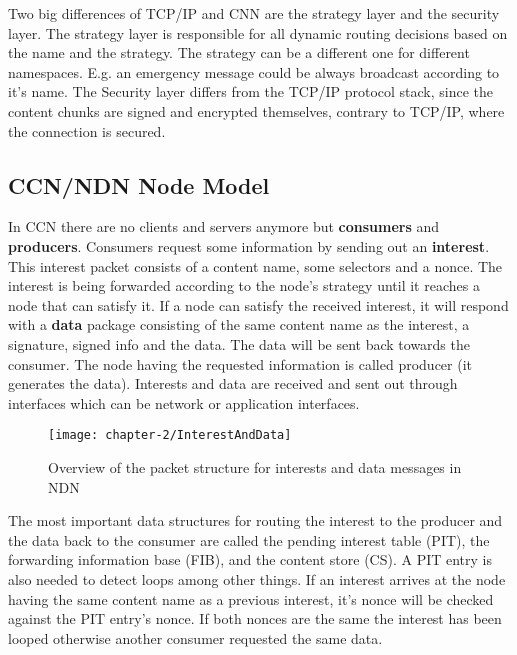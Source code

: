 \vspace{5mm} %

Two big differences of TCP/IP and CNN are the strategy layer and the security layer. The strategy layer is responsible for all dynamic routing decisions based on the name and the strategy. The strategy can be a different one for different namespaces. E.g. an emergency message could be always broadcast according to it's name. The Security layer differs from the TCP/IP protocol stack, since the content chunks are signed and encrypted themselves, contrary to TCP/IP, where the connection is secured.

\subsection{CCN/NDN Node Model}

In CCN there are no clients and servers anymore but \textbf{consumers} and \textbf{producers}. Consumers request some information by sending out an \textbf{interest}. This interest packet consists of a content name, some selectors and a nonce. The interest is being forwarded according to the node's strategy until it reaches a node that can satisfy it. If a node can satisfy the received interest, it will respond with a \textbf{data} package consisting of the same content name as the interest, a signature, signed info and the data. The data will be sent back towards the consumer. The node having the requested information is called producer (it generates the data). Interests and data are received and sent out through interfaces which can be network or application interfaces.

\begin{figure}[H]
  \centering
  \texttt{[image: chapter-2/InterestAndData]}
  \caption{Overview of the packet structure for interests and data messages in NDN}
  \label{fig:InterestAndData}
\end{figure}

The most important data structures for routing the interest to the producer and the data back to the consumer are called the pending interest table (PIT), the forwarding information base (FIB), and the content store (CS). A PIT entry is also needed to detect loops among other things. If an interest arrives at the node having the same content name as a previous interest, it's nonce will be checked against the PIT entry's nonce. If both nonces are the same the interest has been looped otherwise another consumer requested the same data.

